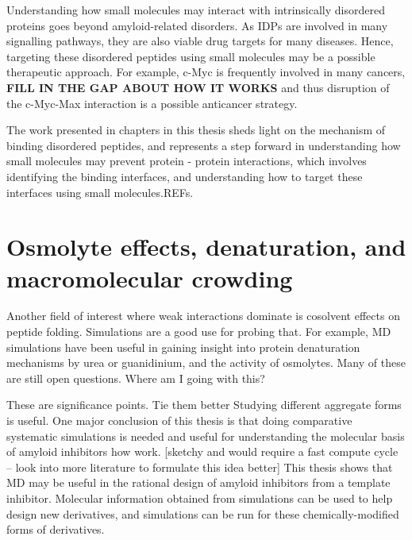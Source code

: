 Understanding how small molecules may interact with intrinsically disordered proteins goes beyond amyloid-related disorders. As IDPs are involved in many signalling pathways, they are also viable drug targets for many diseases.   Hence, targeting these disordered peptides using small molecules may be a possible therapeutic approach. For example, c-Myc is frequently involved in many cancers, \textbf{FILL IN THE GAP ABOUT HOW IT WORKS} and thus disruption of the c-Myc-Max interaction is a possible anticancer strategy.\cite{Iakoucheva:2002uv,Metallo:2010p6822,Cuchillo:2012bm}

The work presented in chapters in this thesis sheds light on the mechanism of binding disordered peptides, and represents a step forward in understanding how small molecules may prevent protein - protein interactions, which involves identifying the binding interfaces, and understanding how to target these interfaces using small molecules.REFs.

\section{Osmolyte effects, denaturation, and macromolecular crowding}
Another field of interest where weak interactions dominate is cosolvent effects on peptide folding. Simulations are a good use for probing that.  For example, MD simulations have been useful in gaining insight into protein denaturation mechanisms by urea or guanidinium, and the activity of osmolytes. Many of these are still open questions.\cite{http://pubs.acs.org/doi/abs/10.1021/jp200625k -- crowding and protein association.} Where am I going with this?

These are significance points.  Tie them better Studying different aggregate forms is useful.  One major conclusion of this thesis is that doing comparative systematic simulations is needed and useful for understanding the molecular basis of amyloid inhibitors how work.
[sketchy and would require a fast compute cycle -- look into more literature to formulate this idea better] This thesis shows that MD may be useful in the rational design of amyloid inhibitors from a template inhibitor. Molecular information obtained from simulations can be used to help design new derivatives, and simulations can be run for these chemically-modified forms of derivatives. 

